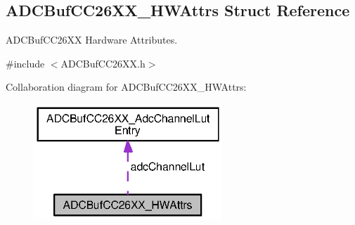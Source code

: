 \subsection{A\+D\+C\+Buf\+C\+C26\+X\+X\+\_\+\+H\+W\+Attrs Struct Reference}
\label{struct_a_d_c_buf_c_c26_x_x___h_w_attrs}


A\+D\+C\+Buf\+C\+C26\+X\+X Hardware Attributes.  




{\ttfamily \#include $<$A\+D\+C\+Buf\+C\+C26\+X\+X.\+h$>$}



Collaboration diagram for A\+D\+C\+Buf\+C\+C26\+X\+X\+\_\+\+H\+W\+Attrs\+:
\nopagebreak
\begin{figure}[H]
\begin{center}
\leavevmode
\includegraphics[width=201pt]{struct_a_d_c_buf_c_c26_x_x___h_w_attrs__coll__graph}
\end{center}
\end{figure}
